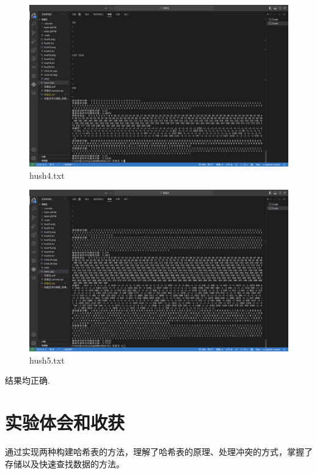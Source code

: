 \documentclass[UTF8]{ctexart}
\begin{document}
\begin{figure}[H]
  \centering
  \includegraphics[scale=0.25]{hush4.png}
  \caption{hush4.txt}
\end{figure}
\begin{figure}[H]
  \centering
  \includegraphics[scale=0.25]{hush5.png}
  \caption{hush5.txt}
\end{figure}
结果均正确.
\section{实验体会和收获}
通过实现两种构建哈希表的方法，理解了哈希表的原理、处理冲突的方式，掌握了存储以及快速查找数据的方法。
\end{document}
